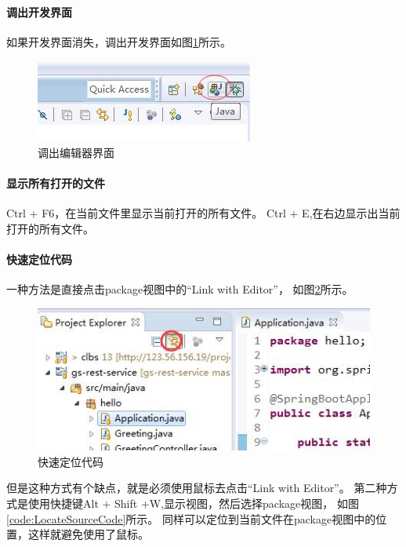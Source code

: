 \documentclass{book}
\begin{document}
\paragraph{调出开发界面}
如果开发界面消失，调出开发界面如图\ref{code:DevelopWindow}所示。

\begin{figure}[htbp]
	\centering
	\includegraphics[scale=0.6]{DevelopWindow.jpg}
	\caption{调出编辑器界面}
	\label{code:DevelopWindow}
\end{figure}

\paragraph{显示所有打开的文件}
Ctrl + F6，在当前文件里显示当前打开的所有文件。
Ctrl + E,在右边显示出当前打开的所有文件。

\paragraph{快速定位代码}
一种方法是直接点击package视图中的“Link with Editor”，
如图\ref{code:EclipseLinkEditor}所示。

\begin{figure}[htbp]
	\centering
	\includegraphics[scale=0.6]{EclipseLinkEditor.jpg}
	\caption{快速定位代码}
	\label{code:EclipseLinkEditor}
\end{figure}

但是这种方式有个缺点，就是必须使用鼠标去点击“Link with Editor”。
第二种方式是使用快捷键Alt + Shift +W,显示视图，然后选择package视图，
如图\ref{code:LocateSourceCode}所示。
同样可以定位到当前文件在package视图中的位置，这样就避免使用了鼠标。
\end{document}
